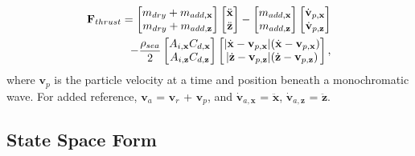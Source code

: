 \documentclass[letterpaper, 10pt, conference]{IEEEtran}
\DeclarePairedDelimiter\abs{\lvert}{\rvert}%
\renewcommand{\vec}[1]{\mathbf{#1}}
\begin{document}
\begin{equation}
\begin{split}
\vec{F}_{thrust} = \begin{bmatrix} m_{dry}+m_{add,\vec{x}} \\ m_{dry}+m_{add,\vec{z}} \end{bmatrix} \begin{bmatrix} \ddot{\vec{x}} \\ \ddot{\vec{z}} \end{bmatrix} - \begin{bmatrix} m_{add,\vec{x}} \\ m_{add,\vec{z}} \end{bmatrix} \begin{bmatrix} \dot{\vec{v}}_{p,\vec{x}} \\ \dot{\vec{v}}_{p,\vec{z}} \end{bmatrix} \\- \frac{\rho_{sea}}{2} \begin{bmatrix} A_{i,\vec{x}}C_{d,\vec{x}} \\ A_{i,\vec{z}}C_{d,\vec{z}} \end{bmatrix} \begin{bmatrix} \abs{\dot{\vec{x}}-\vec{v}_{p,\vec{x}}} (\dot{\vec{x}}-\vec{v}_{p,\vec{x}}) \\ \abs{\dot{\vec{z}}-\vec{v}_{p,\vec{z}}} (\dot{\vec{z}}-\vec{v}_{p,\vec{z}}) \end{bmatrix},
\label{eqn4}
\end{split}
\end{equation}
where $\vec{v}_p$ is the particle velocity at a time and position beneath a monochromatic wave. For added reference, $\vec{v}_a$ = $\vec{v}_r$ + $\vec{v}_p$, and $\dot{\vec{v}}_{a,\vec{x}}$ = $\ddot{\vec{x}}$, $\dot{\vec{v}}_{a,\vec{z}}$ = $\ddot{\vec{z}}$.

\subsection{State Space Form}
\end{document}
